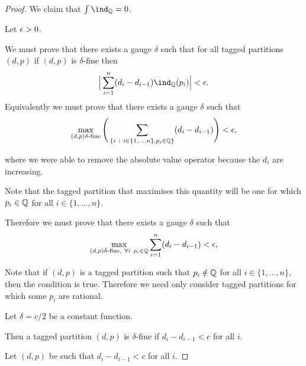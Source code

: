 \begin{proof}
  We claim that $\int \ind_\Q = 0$.

  Let $\epsilon > 0$.

  We must prove that there exists a gauge $\delta$ such that for all tagged partitions $(d, p)$ if $(d, p)$
  is $\delta$-fine then
  \begin{align*}
    \Big|\sum_{i=1}^n (d_i - d_{i-1})\ind_\Q(p_i)\Big| < \eps.
  \end{align*}
  Equivalently we must prove that there exists a gauge $\delta$ such that
  \begin{align*}
    \max_{(d, p) \delta\text{-fine}} \Bigg( \sum_{\{i ~:~ i \in \{1, \ldots, n\}, p_i \in \mathbb{Q}\}} (d_i - d_{i-1}) \Bigg) < \epsilon,
  \end{align*}

  where we were able to remove the absolute value operator because the $d_i$ are increasing.

  Note that the tagged partition that maximises this quantity will be one for which $p_i \in \mathbb{Q}$ for
  all $i \in \{1, \ldots, n\}$.

  Therefore we must prove that there exists a gauge $\delta$ such that
  \begin{align*}
    \max_{(d, p) \delta\text{-fine}, ~\forall i ~ p_i \in \mathbb{Q}} \sum_{i=1}^n (d_i - d_{i-1}) < \epsilon,
  \end{align*}



  Note that if $(d, p)$ is a tagged partition such that $p_i \notin \mathbb{Q}$ for all $i \in \{1, \ldots, n\}$, then
  the condition is true. Therefore we need only consider tagged partitions for which some $p_i$ are rational.

  Let $\delta = c/2$ be a constant function.

  Then a tagged partition $(d, p)$ is $\delta$-fine if $d_{i} - d_{i-1} < c$ for all $i$.

  Let   $(d, p)$ be such that $d_{i} - d_{i-1} < c$ for all $i$.

\end{proof}










